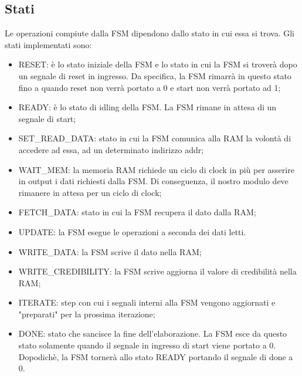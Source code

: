 \documentclass{article}
\begin{document}
\subsection{Stati}
Le operazioni compiute dalla FSM dipendono dallo stato in cui essa si trova. Gli stati implementati sono:
\begin{itemize}
    \item RESET: è lo stato iniziale della FSM e lo stato in cui la FSM si troverà dopo un segnale di reset in ingresso. Da specifica, la FSM rimarrà in questo stato fino a quando reset non verrà portato a 0 e start non verrà portato ad 1;
    \item READY: è lo stato di idling della FSM. La FSM rimane in attesa di un segnale di start;
    \item SET\_READ\_DATA: stato in cui la FSM comunica alla RAM la volontà di accedere ad essa, ad un determinato indirizzo addr;
    \item WAIT\_MEM: la memoria RAM richiede un ciclo di clock in più per asserire in output i dati richiesti dalla FSM. Di conseguenza, il nostro modulo deve rimanere in attesa per un ciclo di clock;
    \item FETCH\_DATA: stato in cui la FSM recupera il dato dalla RAM;
    \item UPDATE: la FSM esegue le operazioni a seconda dei dati letti.
    \item WRITE\_DATA: la FSM scrive il dato nella RAM;
    \item WRITE\_CREDIBILITY: la FSM scrive aggiorna il valore di credibilità nella RAM; 
    \item ITERATE: step con cui i segnali interni alla FSM vengono aggiornati e "preparati" per la prossima iterazione;
    \item DONE: stato che sancisce la fine dell'elaborazione. La FSM esce da questo stato solamente quando il segnale in ingresso di start viene portato a 0. Dopodichè, la FSM tornerà allo stato READY portando il segnale di done a 0.
\end{itemize}

\newpage
\end{document}
